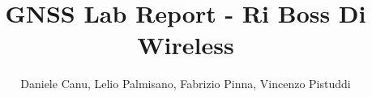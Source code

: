 \documentclass[sigconf]{acmart}
\begin{document}
\fancyhead{}
\def\thetitle{GNSS Lab Report - Ri Boss Di Wireless}
\title{\thetitle}

\author{Daniele Canu, Lelio Palmisano, Fabrizio Pinna, Vincenzo Pistuddi}
\date{}



\maketitle
{}

%

%








\appendix

\end{document}
